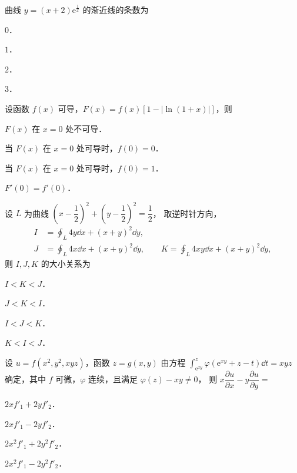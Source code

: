 
\begin{question}[index=1]
曲线 $y=(x+2)\mathrm e^{\frac{1}{x}}$ 的渐近线的条数为
\begin{choices}[columns=4]
\item $0$．
\item $1$．
\item $2$．
\item $3$．
\end{choices}
\end{question}
\QuestionBreak

\begin{question}[index=2]
设函数 $f(x)$ 可导，$F(x)=f(x)[1-|\ln(1+x)|]$，则
\begin{choices}[columns=1]
\item $F(x)$ 在 $x=0$ 处不可导．
\item 当 $F(x)$ 在 $x=0$ 处可导时，$f(0)=0$．
\item 当 $F(x)$ 在 $x=0$ 处可导时，$f(0)=1$．
\item $F'(0)=f'(0)$．
\end{choices}
\end{question}
\QuestionBreak

\begin{question}[index=3]
设 $L$ 为曲线 $\left(x-\dfrac{1}{2}\right)^2+\left(y-\dfrac{1}{2}\right)^2=\dfrac{1}{2}$，
取逆时针方向，
\[
\begin{aligned}
I&=\oint_L 4y\dd x+(x+y)^2\dd y,\\
J&=\oint_L 4x\dd x+(x+y)^2\dd y,\qquad
K=\oint_L 4xy\dd x+(x+y)^2\dd y,
\end{aligned}
\]
则 $I,J,K$ 的大小关系为
\begin{choices}[columns=2]
\item $I<K<J$．
\item $J<K<I$．
\item $I<J<K$．
\item $K<I<J$．
\end{choices}
\end{question}
\QuestionBreak

\begin{question}[index=4]
设 $u=f(x^2,y^2,xyz)$，函数 $z=g(x,y)$ 由方程
$\displaystyle\int_{\mathrm e^{xy}}^z\varphi(\mathrm e^{xy}+z-t)\dd t=xyz$
确定，其中 $f$ 可微，$\varphi$ 连续，且满足 $\varphi(z)-xy\ne0$，
则 $x\dfrac{\partial u}{\partial x}-y\dfrac{\partial u}{\partial y}=$
\begin{choices}[columns=2]
\item $2xf'_1+2yf'_2$．
\item $2xf'_1-2yf'_2$．
\item $2x^2f'_1+2y^2f'_2$．
\item $2x^2f'_1-2y^2f'_2$．
\end{choices}
\end{question}
\QuestionBreak

